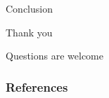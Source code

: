 \documentclass[aspectratio=169]{beamer}
\begin{document}

\begin{frame}{Conclusion}
    \vfill
    \begin{center}
        \large Thank you
    \end{center}
    \vfill
    \begin{center}
        \large Questions are welcome
    \end{center}
    \vfill
\end{frame}





\begin{frame}
    \frametitle{References}
    \footnotesize
    
\end{frame}
    


\end{document}
